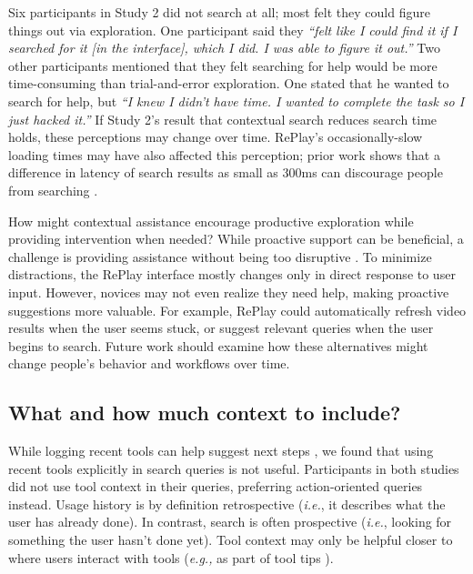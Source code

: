 Six participants in Study 2 did not search at all; most felt they could figure things out via exploration. One participant said they \textit{``felt like I could find it if I searched for it [in the interface], which I did. I was able to figure it out.''} Two other participants mentioned that they felt searching for help would be more time-consuming than trial-and-error exploration. One stated that he wanted to search for help, but \textit{``I knew I didn't have time. I wanted to complete the task so I just hacked it.''} If Study 2's result that contextual search reduces search time holds, these perceptions may change over time. RePlay's occasionally-slow loading times may have also affected this perception; prior work shows that a difference in latency of search results as small as 300ms can discourage people from searching \cite{Brutlag2009}.

How might contextual assistance encourage productive exploration while providing intervention when needed? While proactive support can be beneficial, a challenge is providing assistance without being too disruptive \cite{Matejka2011}. To minimize distractions, the RePlay interface mostly changes only in direct response to user input. However, novices may not even realize they need help, making proactive suggestions more valuable. For example, RePlay could automatically refresh video results when the user seems stuck, or suggest relevant queries when the user begins to search. Future work should examine how these alternatives might change people's behavior and workflows over time.

\subsection{What and how much context to include?}
While logging recent tools can help suggest next steps \cite{Matejka2009}, we found that using recent tools explicitly in search queries is not useful. Participants in both studies did not use tool context in their queries, preferring action-oriented queries instead. Usage history is by definition retrospective (\textit{i.e.}, it describes what the user has already done). In contrast, search is often prospective (\textit{i.e.}, looking for something the user hasn't done yet). Tool context may only be helpful closer to where users interact with tools (\textit{e.g.,} as part of tool tips \cite{Grossman2010a}).

